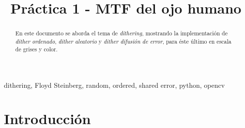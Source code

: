 \documentclass[conference]{IEEEtran}
\begin{document}
\title{Práctica 1 - MTF del ojo humano\\
}


\author{
\and
{}

}

\maketitle


\begin{abstract}
En este documento se aborda el tema de \textit{dithering}, mostrando la implementación de \textit{dither ordenado}, \textit{dither aleatorio} y \textit{dither difusión de error}, para éste último en escala de grises y color.
\end{abstract}

\begin{IEEEkeywords}
dithering, Floyd Steinberg, random, ordered, shared error, python, opencv
\end{IEEEkeywords}

\section{Introducción}

\textcolor{violet}{\lipsum[3]}
\end{document}
